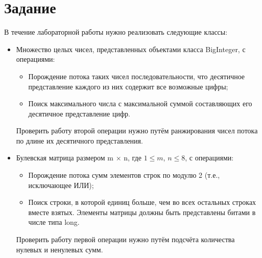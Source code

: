 \documentclass[a4paper, 14pt]{extarticle}
\begin{document}
\section{Задание}
В течение лабораторной работы нужно реализовать следующие классы:
\begin{itemize}
    \item Множество целых чисел, представленных объектами класса BigInteger, с операциями: 
\begin{itemize}
    \item Порождение потока таких чисел последовательности, что десятичное представление каждого из них содержит все возможные цифры; 
    \item Поиск максимального числа с максимальной суммой составляющих его десятичное представление цифр.
\end{itemize}

Проверить работу второй операции нужно путём ранжирования чисел потока по длине их десятичного представления. 

 
    \item Булевская матрица размером m × n, где $1 \leq m$, $n \leq 8$, с операциями: 
\begin{itemize}
    \item Порождение потока сумм элементов строк по модулю 2 (т.е., исключающее ИЛИ); 
    \item Поиск строки, в которой единиц больше, чем во всех остальных строках вместе взятых. Элементы матрицы должны быть представлены битами в числе типа long. 
\end{itemize}

Проверить работу первой операции нужно путём подсчёта количества нулевых и ненулевых сумм. 



\end{itemize}

\pagebreak
\end{document}
